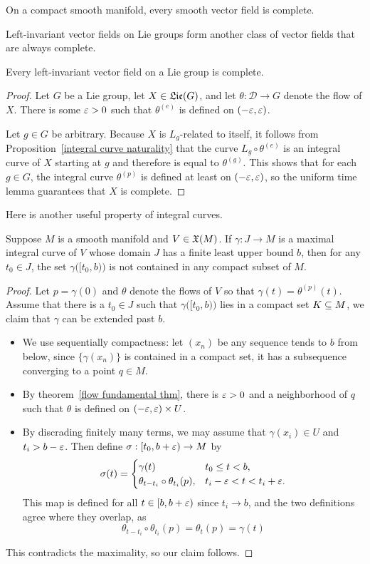 \begin{corollary}\label{vector field compact mani complete}
On a compact smooth manifold, every smooth vector field is
complete.
\end{corollary}
Left-invariant vector fields on Lie groups form another class of vector fields that are always complete.
\begin{theorem}\label{vector field left-inva complete}
Every left-invariant vector field on a Lie group is complete.
\end{theorem}
\begin{proof}
Let $G$ be a Lie group, let $X\in\mathfrak{Lie}(G)$, and let $\theta:\mathcal{D}\to G$ denote the flow of $X$. There is some $\varepsilon>0$ such that $\theta^{(e)}$ is defined on $(-\varepsilon,\varepsilon)$.\par Let $g\in G$ be arbitrary. Because $X$ is $L_g$-related to itself, it follows from Proposition~\ref{integral curve naturality} that the curve $L_g\circ\theta^{(e)}$ is an integral curve of $X$ starting at $g$ and therefore is equal to $\theta^{(g)}$. This shows that for each $g\in G$, the integral curve $\theta^{(p)}$ is defined at least on $(-\varepsilon,\varepsilon)$, so the uniform time lemma guarantees that $X$ is complete.
\end{proof}
Here is another useful property of integral curves.
\begin{lemma}\label{vector flow escape lemma}
Suppose $M$ is a smooth manifold and $V\in\mathfrak{X}(M)$. If $\gamma:J\to M$ is a maximal integral curve of $V$ whose domain $J$ has a finite least upper bound $b$, then for any $t_0\in J$, the set $\gamma\big([t_0,b)\big)$ is not contained in any compact subset
of $M$.
\end{lemma}
\begin{proof}
Let $p=\gamma(0)$ and $\theta$ denote the flows of $V$ so that $\gamma(t)=\theta^{(p)}(t)$. Assume 
that there is a $t_0\in J$ such that $\gamma\big([t_0,b)\big)$ lies in a compact set $K\subseteq M$, we 
claim that $\gamma$ can be extended past $b$.
\begin{itemize}
\item We use sequentially compactness: let $(x_n)$ be any sequence tends to $b$ from below, since $\{\gamma(x_n)\}$ is contained in a compact set, it has a subsequence converging to a point $q\in M$.
\item By theorem~\ref{flow fundamental thm}, there is $\varepsilon>0$ and a neighborhood of $q$ such that $\theta$ is defined on $(-\varepsilon,\varepsilon)\times U$.
\item By discrading finitely many terms, we may assume that $\gamma(x_i)\in U$ and $t_i>b-\varepsilon$. Then define $\sigma:[t_0,b+\varepsilon)\to M$ by
\[\sigma(t)=\begin{cases}
\gamma(t)&t_0\leq t<b,\\
\theta_{t-t_i}\circ\theta_{t_i}(p),&t_i-\varepsilon<t<t_i+\varepsilon.
\end{cases}\]
This map is defined for all $t\in[b,b+\varepsilon)$ since $t_i\to b$, and the two definitions agree where they overlap, as
\[\theta_{t-t_i}\circ\theta_{t_i}(p)=\theta_t(p)=\gamma(t)\]
\end{itemize}
This contradicts the maximality, so our claim follows.
\end{proof}
